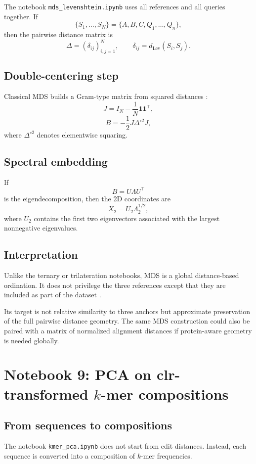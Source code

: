 \documentclass[11pt,a4paper]{article}
\begin{document}
The notebook \texttt{mds\_levenshtein.ipynb} uses all references and all queries together. If
\[
\{S_1,\dots,S_N\}=\{A,B,C,Q_1,\dots,Q_n\},
\]
then the pairwise distance matrix is
\[
\Delta=(\delta_{ij})_{i,j=1}^{N},
\qquad
\delta_{ij}=d_{\mathrm{Lev}}(S_i,S_j).
\]

\subsection{Double-centering step}

Classical MDS builds a Gram-type matrix from squared distances \cite{Legendre2012}:
\[
J=I_N-\frac{1}{N}\bm{1}\bm{1}^\top,
\]
\[
B=-\frac12 J\Delta^{\circ 2}J,
\]
where $\Delta^{\circ 2}$ denotes elementwise squaring.

\subsection{Spectral embedding}

If
\[
B=U\Lambda U^\top
\]
is the eigendecomposition, then the 2D coordinates are
\[
X_2=U_2\Lambda_2^{1/2},
\]
where $U_2$ contains the first two eigenvectors associated with the largest nonnegative eigenvalues.

\subsection{Interpretation}

Unlike the ternary or trilateration notebooks, MDS is a global distance-based ordination. It does not privilege the three references except that they are included as part of the dataset \cite{Legendre2012}.

Its target is not relative similarity to three anchors but approximate preservation of the full pairwise distance geometry. The same MDS construction could also be paired with a matrix of normalized alignment distances if protein-aware geometry is needed globally.

\section{Notebook 9: PCA on clr-transformed $k$-mer compositions}

\subsection{From sequences to compositions}

The notebook \texttt{kmer\_pca.ipynb} does not start from edit distances. Instead, each sequence is converted into a composition of $k$-mer frequencies.
\end{document}
